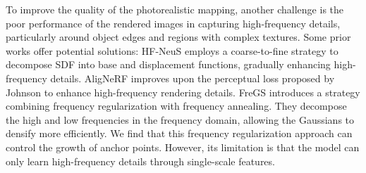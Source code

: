 
To improve the quality of the photorealistic mapping, another challenge is the poor performance of the rendered images in capturing high-frequency details, particularly around object edges and regions with complex textures. Some prior works offer potential solutions: HF-NeuS \cite{HF-NeuS2022} employs a coarse-to-fine strategy to decompose SDF into base and displacement functions, gradually enhancing high-frequency details. AligNeRF \cite{AligNeRF2023} improves upon the perceptual loss proposed by Johnson \cite{Johnson} to enhance high-frequency rendering details. FreGS \cite{FreGS2024} introduces a strategy combining frequency regularization with frequency annealing. They decompose the high and low frequencies in the frequency domain, allowing the Gaussians to densify more efficiently. We find that this frequency regularization approach can control the growth of anchor points. However, its limitation is that the model can only learn high-frequency details through single-scale features.


